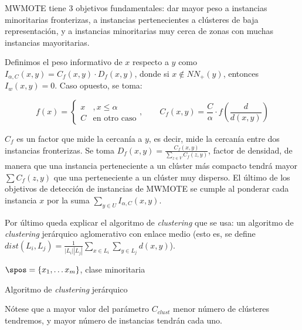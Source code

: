 MWMOTE tiene 3 objetivos fundamentales: dar mayor peso a instancias minoritarias fronterizas, a instancias pertenecientes
a clústeres de baja representación, y a instancias minoritarias muy cerca de zonas con muchas instancias mayoritarias.

Definimos el peso informativo de $x$ respecto a $y$ como $I_{\alpha,C}(x,y) = C_f(x,y) \cdot D_f(x,y)$, donde si $x \notin NN_{+}(y)$,
entonces $I_w(x,y) = 0$. Caso opuesto, se toma:

\[f(x) = \left\{\begin{array}{ll} 
                x &, x\le \alpha \\
                C & \textrm{en otro caso}
               \end{array}\right.,\qquad C_f(x,y) = \frac{C}{\alpha} \cdot f\left(\frac{d}{d(x,y)}\right)\]

$C_f$ es un factor que mide la cercanía a $y$, es decir, mide la cercanía entre dos instancias fronterizas. Se toma 
$D_f(x,y) = \frac{C_f(x,y)}{\sum_{z\in V} C_f(z,y)}$, factor de densidad, de manera que una instancia perteneciente
a un clúster más compacto tendrá mayor $\sum C_f(z,y)$ que una perteneciente a un clúster muy disperso. El último de los
objetivos de detección de instancias de MWMOTE se cumple al ponderar cada instancia $x$ por la suma 
$\sum_{y\in U} I_{\alpha, C}(x,y)$.

Por último queda explicar el algoritmo de \textit{clustering} que se usa: un algoritmo de \textit{clustering} jerárquico
aglomerativo con enlace medio (esto es, se define $dist(L_i, L_j) = \frac{1}{|L_i||L_j|} \sum_{x\in L_i} \sum_{y\in L_j} d(x,y)$).


\begin{algorithm}[H]
\begin{algorithmic}[1]
  \REQUIRE $\spos = \{x_1, \ldots x_m\}$, clase minoritaria
  \ENDWHILE
\end{algorithmic}
\caption{Algoritmo de \textit{clustering} jerárquico}
\label{alg:hclust}
\end{algorithm}

Nótese que a mayor valor del parámetro $C_{clust}$ menor número de clústeres tendremos, y mayor número de instancias tendrán
cada uno.
